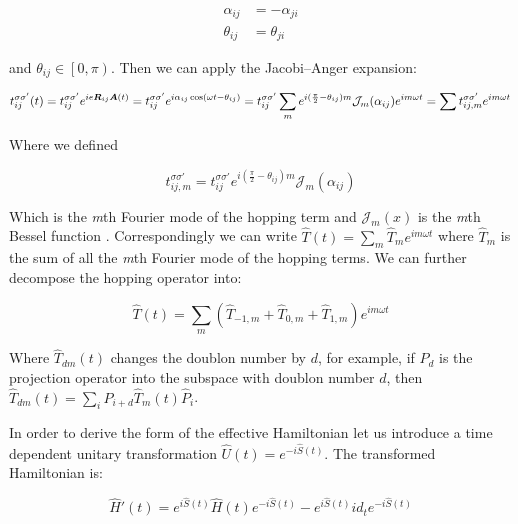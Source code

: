 \begin{align}
\alpha_{ij} &= -\alpha_{ji} \label{alphaSym} \\
\theta_{ij} &= \theta_{ji} \label{thetaSym}
\end{align}

and $\theta_{ij} \in \left[0,\pi\right)$. Then we can apply the Jacobi–Anger expansion:

\begin{align*}
t_{ij}^{\sigma \sigma'}(t) = t_{ij}^{\sigma \sigma'}e^{ie\boldsymbol{R}_{ij}\boldsymbol{A}(t)} = t_{ij}^{\sigma \sigma'}e^{i\alpha_{ij} \cos(\omega t - \theta_{ij})} = t_{ij}^{\sigma \sigma'}\sum_m e^{i(\frac{\pi}{2}-\theta_{ij})m} \mathcal{J}_m(\alpha_{ij}) e^{im\omega t} = \sum t_{ij,m}^{\sigma \sigma'} e^{im\omega t}
\end{align*}

Where we defined 

\begin{equation}
\label{HoppAmpFourier}
t_{ij,m}^{\sigma \sigma'} = t_{ij}^{\sigma \sigma'} e^{i(\frac{\pi}{2}-\theta_{ij})m} \mathcal{J}_m(\alpha_{ij})
\end{equation}

Which is the \textit{m}th Fourier mode of the hopping term and $\mathcal{J}_m(x)$ is the \textit{m}th Bessel function \cite{Kitamura2017}. Correspondingly we can write $\hat{T}(t) = \sum_m \hat{T}_m e^{im \omega t}$ where $\hat{T}_m$ is the sum of all the \textit{m}th Fourier mode of the hopping terms. We can further decompose the hopping operator into:

\begin{equation}
\hat{T}(t) = \sum_m (\hat{T}_{-1,m}+\hat{T}_{0,m}+\hat{T}_{1,m})e^{im\omega t}
\end{equation}

Where $\hat{T}_{dm}(t)$ changes the doublon number by $d$, for example, if $\hat{P}_d$ is the projection operator into the subspace with doublon number $d$, then $\hat{T}_{dm}(t) = \sum_i \hat{P}_{i+d}\hat{T}_{m}(t)\hat{P}_i$.

In order to derive the form of the effective Hamiltonian let us introduce a time dependent unitary transformation $\hat{U}(t) = e^{-i\hat{S}(t)}$. The transformed Hamiltonian is:

\begin{equation}
\hat{H}'(t) = e^{i\hat{S}(t)} \hat{H}(t) e^{-i\hat{S}(t)} - e^{i\hat{S}(t)} id_t e^{-i\hat{S}(t)}
\end{equation} 

